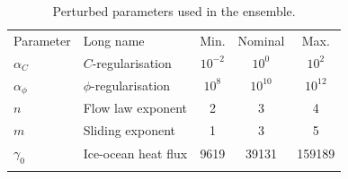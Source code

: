 \documentclass[journal abbreviation, manuscript]{copernicus}
\begin{document}

\begin{table}[t]
\caption{Perturbed parameters used in the ensemble.}\label{tab:parameters}
\begin{tabular}{l l c c c}
\tophline{}
Parameter & Long name & Min. & Nominal & Max. \\
\middlehline{}
$\alpha_C$ & $C$-regularisation & $10^{-2}$ & $10^0$ & $10^2$ \\
$\alpha_{\phi}$ & $\phi$-regularisation & $10^8$ & $10^{10}$ & $10^{12}$ \\
$n$ & Flow law exponent & 2 & 3 & 4 \\
$m$ & Sliding exponent & 1 & 3 & 5 \\
$\gamma_0$ & Ice-ocean heat flux & 9619 & 39131 & 159189 \\
\bottomhline{}
\end{tabular}
\end{table}
\end{document}
